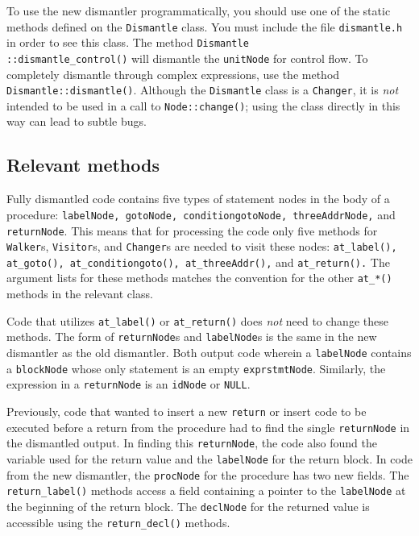 \documentclass{article}
\begin{document}
To use the new dismantler programmatically, you should use one of the
static methods defined on the \texttt{Dismantle} class.  You must
include the file \texttt{dismantle.h} in order to see this class.  The
method \texttt{Dismantle\\::dismantle\_control()} will dismantle the
\texttt{unitNode} for control flow.  To completely dismantle
through complex expressions, use the method
\texttt{Dismantle::dismantle()}.  Although the \texttt{Dismantle} 
class is a \texttt{Changer}, it is \emph{not} intended to be used in a
call to \texttt{Node::change()}; using the class directly in this way
can lead to subtle bugs.

\subsection{\label{migrate:methods} Relevant methods}

Fully dismantled code contains five types of statement nodes in
the body of a procedure: \texttt{labelNode, gotoNode,
conditiongotoNode, threeAddrNode,} and \texttt{returnNode}.  This
means that for processing the code only five methods for
\texttt{Walker}s, \texttt{Visitor}s, and \texttt{Changer}s are needed
to visit these nodes: \texttt{at\_label(), at\_goto(),
at\_conditiongoto(), at\_threeAddr(),} and
\texttt{at\_return().}  The argument lists for these methods matches
the convention for the other \texttt{at\_*()} methods in the relevant
class.

Code that utilizes \texttt{at\_label()} or \texttt{at\_return()}
does \emph{not} need to change these methods.  The form of
\texttt{returnNode}s and \texttt{labelNode}s is the same in the new
dismantler as the old dismantler.  Both output code wherein a
\texttt{labelNode} contains a \texttt{blockNode} whose only statement is an
empty \texttt{exprstmtNode}.  Similarly, the expression in a
\texttt{returnNode} is an \texttt{idNode} or \texttt{NULL}.

Previously, code that wanted to insert a new \texttt{return} or insert
code to be executed before a return from the procedure had to find the
single \texttt{returnNode} in the dismantled output.  In finding this
\texttt{returnNode}, the code also found the variable used for the return 
value and the \texttt{labelNode} for the return block.  In code from
the new dismantler, the \texttt{procNode} for the procedure has two
new fields.  The \texttt{return\_label()} methods access a field
containing a pointer to the \texttt{labelNode} at the beginning of the 
return block.  The \texttt{declNode} for the returned value is accessible
using the \texttt{return\_decl()} methods.
\end{document}

